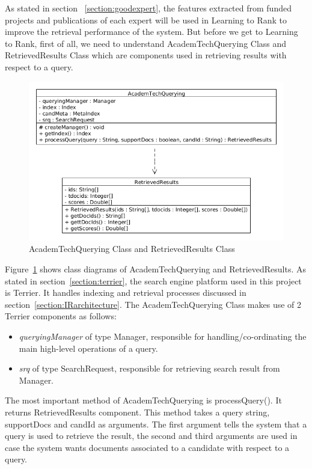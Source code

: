 As stated in section ~\ref{section:goodexpert}, the features extracted from funded projects and publications of each expert will be used in Learning to Rank
to improve the retrieval performance of the system. But before we get to Learning to Rank, first of all, we need to understand
AcademTechQuerying Class and RetrievedResults Class which are components used in retrieving results with respect to a query. 
\begin{figure}
\centering
\includegraphics[scale=0.4]{./figures/AcademTechQuerying.png}
\caption{AcademTechQuerying Class and RetrievedResults Class} \label{fig:AcademTechQuerying} 
\end{figure}

Figure~\ref{fig:AcademTechQuerying} shows class diagrams of AcademTechQuerying and RetrievedResults. As stated in section~\ref{section:terrier},
the search engine platform used in this project is Terrier. It handles indexing and retrieval processes discussed in section~\ref{section:IRarchitecture}.
The AcademTechQuerying Class makes use of 2 Terrier components as follows:  
\begin{itemize}
 \item \textit{queryingManager} of type Manager, responsible for handling/co-ordinating the main high-level operations of a query.
 \item \textit{srq} of type SearchRequest, responsible for retrieving search result from Manager.
\end{itemize}
The most important method of AcademTechQuerying is processQuery(). It returns RetrievedResults component. This method takes a query string, supportDocs and candId as arguments. The first argument tells
the system that a query is used to retrieve the result, the second and third arguments are used in case the system wants documents associated to a candidate 
with respect to a query.

